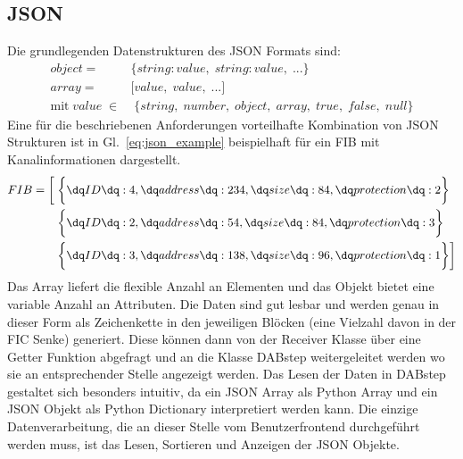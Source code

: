 \subsection{JSON}
Die grundlegenden Datenstrukturen des JSON Formats sind:
\begin{equation}
\begin{aligned}
object =& \biggl\{string : value,\;string : value,\; ...\biggl\} \\
array =& \biggl[value, \;value, \;...\biggl] \\
\text{mit} \; value \; \in& \; \{string,\; number,\; object,\; array,\; true,\; false,\; null\}
\end{aligned}
\end{equation}
Eine für die beschriebenen Anforderungen vorteilhafte Kombination von JSON Strukturen ist in Gl.~\ref{eq:json_example} beispielhaft für ein FIB mit Kanalinformationen dargestellt.
\begin{equation}
\label{eq:json_example}
\begin{aligned}
FIB = \biggl[
& \; \biggl \{ \text{\dq} ID \text{\dq} :4, \text{\dq} address \text{\dq} : 234, \text{\dq} size \text{\dq} : 84, \text{\dq} protection \text{\dq} : 2 \biggl \} \\
& \; \biggl\{\text{\dq}ID\text{\dq}:2,\text{\dq}address\text{\dq}:54,\text{\dq}size\text{\dq}:84,\text{\dq}protection\text{\dq}:3\biggl\} \\
& \; \biggl\{\text{\dq}ID\text{\dq}:3,\text{\dq}address\text{\dq}:138,\text{\dq}size\text{\dq}:96,\text{\dq}protection\text{\dq}:1\biggl\} \biggl]
\end{aligned}
\end{equation}
Das Array liefert die flexible Anzahl an Elementen und das Objekt bietet eine variable Anzahl an Attributen. Die Daten sind gut lesbar und werden genau in dieser Form als Zeichenkette in den jeweiligen Blöcken (eine Vielzahl davon in der FIC Senke) generiert. Diese können dann von der Receiver Klasse über eine Getter Funktion abgefragt und an die Klasse DABstep weitergeleitet werden wo sie an entsprechender Stelle angezeigt werden. Das Lesen der Daten in DABstep gestaltet sich besonders intuitiv, da ein JSON Array als Python Array und ein JSON Objekt als Python Dictionary interpretiert werden kann. Die einzige Datenverarbeitung, die an dieser Stelle vom Benutzerfrontend durchgeführt werden muss, ist das Lesen, Sortieren und Anzeigen der JSON Objekte.

